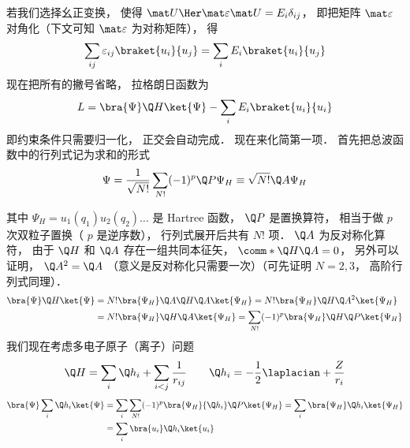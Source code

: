 若我们选择幺正变换， 使得 ${\mat U\Her }\mat \varepsilon \mat U = {E_i}{\delta_{ij}}$， %
即把矩阵 $\mat \varepsilon$ 对角化（下文可知 $\mat\varepsilon$ 为对称矩阵）， 得
\begin{equation}
\sum_{ij} \varepsilon_{ij} \braket{u_i}{u_j}
= \sum_i {E_i}  \braket{u_i}{u_j}
\end{equation}
现在把所有的撇号省略， 拉格朗日函数为
\begin{equation}
L =\bra{\Psi}\Q H \ket{\Psi}  - \sum_i E_i \braket{u_i}{u_i}
\end{equation}
即约束条件只需要归一化， 正交会自动完成． 现在来化简第一项． 首先把总波函数中的行列式记为求和的形式
\begin{equation}
\Psi  = \frac{1}{\sqrt {N!}} \sum_{N!} (-1)^p \Q P{\Psi_H}  \equiv \sqrt{N!} \Q A \Psi_H
\end{equation}

其中 $\Psi_H = u_1(q_1) u_2(q_2)\dots$ 是 Hartree 函数，  $\Q P$ 是置换算符， 相当于做 $p$ 次双粒子置换（ $p$ 是逆序数）， 行列式展开后共有 $N!$ 项．  $\Q A$ 为反对称化算符， 由于 $\Q H$ 和 $\Q A$ 存在一组共同本征矢， $\comm*{\Q H}{\Q A} = 0$，  另外可以证明， $\Q A^2 = \Q A$ （意义是反对称化只需要一次）（可先证明 $N = 2,3$，  高阶行列式同理）．
\begin{equation}
\begin{aligned}
\bra{\Psi}\Q H\ket{\Psi}  &= N!\bra{\Psi_H} \Q A\Q H\Q A \ket{\Psi_H} = N!\bra{\Psi_H}\Q H \Q A^2\ket{\Psi_H} \\
&= N!\bra{\Psi_H} \Q H\Q A\ket{\Psi_H}   = \sum_{N!} (-1)^p \bra{\Psi_H}\Q H\Q P\ket{\Psi_H}\\ 
\end{aligned}
\end{equation}
我们现在考虑多电子原子（离子）问题
\begin{equation}
\Q H = \sum_i \Q h_i + \sum_{i < j} \frac{1}{r_{ij}} \qquad
\Q h_i =  - \frac12 \laplacian + \frac{Z}{r_i}
\end{equation}
\begin{equation}
\begin{aligned}
\bra{\Psi}\sum_i \Q h_i \ket{\Psi} & = \sum_i \sum_{N!} ( - 1)^p \bra{\Psi_H}{\Q h_i}\Q P \ket{\Psi_H} = \sum_i \bra{\Psi_H} \Q h_i \ket{\Psi_H}\\
&= \sum_i \bra{u_i} \Q h_i \ket{u_i}
\end{aligned}
\end{equation}
 
